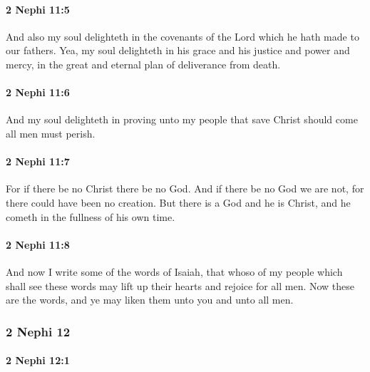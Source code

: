 		\paragraph{2 Nephi 11:5} %
			\label{2NEPHI-11-5}

			And also my soul delighteth in the covenants of the Lord
			which he hath made to our fathers.
			Yea, my soul delighteth in his grace and his justice and power and mercy,
			in the great and eternal plan of deliverance from death.

		\paragraph{2 Nephi 11:6} %
			\label{2NEPHI-11-6}

			And my soul delighteth in proving unto my people
			that save Christ should come all men must perish.

		\paragraph{2 Nephi 11:7} %
			\label{2NEPHI-11-7}

			For if there be no Christ there be no God.
			And if there be no God we are not,
			for there could have been no creation.
			But there is a God and he is Christ,
			and he cometh in the fullness of his own time.

		\paragraph{2 Nephi 11:8} %
			\label{2NEPHI-11-8}

			And now I write some of the words of Isaiah,
			that whoso of my people which shall see these words
			may lift up their hearts and rejoice for all men.
			Now these are the words, and ye may liken them unto you and unto all men.

	\subsubsection{2 Nephi 12} %
		\label{2NEPHI-12}
		
		\paragraph{2 Nephi 12:1} %
			\label{2NEPHI-12-1}

